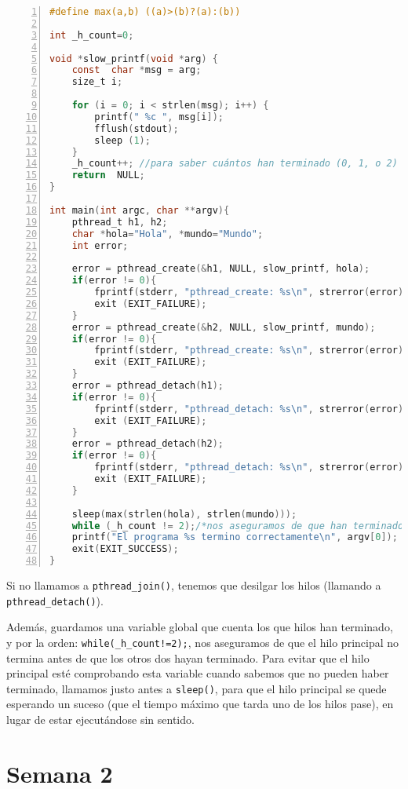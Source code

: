 \documentclass{article}
\begin{document}
\begin{lstlisting}[language=C, texcl=true, numbers=left]
#define max(a,b) ((a)>(b)?(a):(b))

int _h_count=0;

void *slow_printf(void *arg) {
    const  char *msg = arg;
    size_t i;
    
    for (i = 0; i < strlen(msg); i++) {
        printf(" %c ", msg[i]);
        fflush(stdout);
        sleep (1);
    }    
    _h_count++; //para saber cuántos han terminado (0, 1, o 2)
    return  NULL;
}

int main(int argc, char **argv){
    pthread_t h1, h2;
    char *hola="Hola", *mundo="Mundo";
    int error;

    error = pthread_create(&h1, NULL, slow_printf, hola);
    if(error != 0){
        fprintf(stderr, "pthread_create: %s\n", strerror(error));
        exit (EXIT_FAILURE);
    }
    error = pthread_create(&h2, NULL, slow_printf, mundo);
    if(error != 0){
        fprintf(stderr, "pthread_create: %s\n", strerror(error));
        exit (EXIT_FAILURE);
    }
    error = pthread_detach(h1);
    if(error != 0){ 
        fprintf(stderr, "pthread_detach: %s\n", strerror(error));
        exit (EXIT_FAILURE);
    }
    error = pthread_detach(h2);
    if(error != 0){
        fprintf(stderr, "pthread_detach: %s\n", strerror(error));
        exit (EXIT_FAILURE);
    }

    sleep(max(strlen(hola), strlen(mundo))); 
    while (_h_count != 2);/*nos aseguramos de que han terminado*/
    printf("El programa %s termino correctamente\n", argv[0]);
    exit(EXIT_SUCCESS);
}
\end{lstlisting}

Si no llamamos a \texttt{pthread\_join()}, tenemos que desilgar los hilos (llamando a \texttt{pthread\_detach()}).

Además, guardamos una variable global que cuenta los que hilos han terminado, y por la orden: \texttt{while(\_h\_count!=2);}, nos aseguramos de que el hilo principal no termina antes de que los otros dos hayan terminado. Para evitar que el hilo principal esté comprobando esta variable cuando sabemos que no pueden haber terminado, llamamos justo antes a \texttt{sleep()}, para que el hilo principal se quede esperando un suceso (que el tiempo máximo que tarda uno de los hilos pase), en lugar de estar ejecutándose sin sentido.

\section*{Semana 2}
\end{document}

